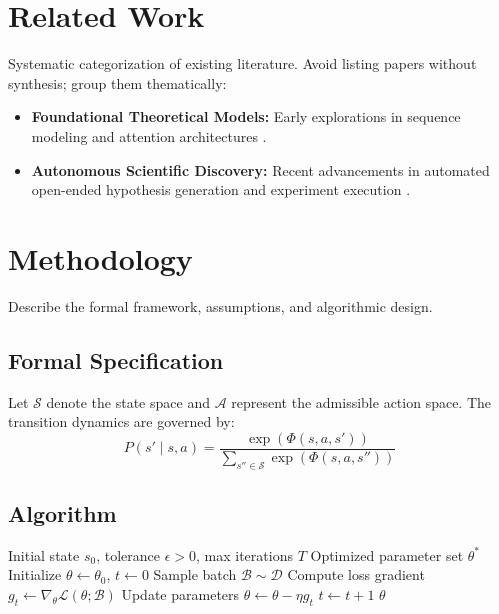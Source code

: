 \documentclass[11pt,a4paper]{article}
\begin{document}
\section{Related Work}
\label{sec:related}
Systematic categorization of existing literature. Avoid listing papers without synthesis; group them thematically:
\begin{itemize}
    \item \textbf{Foundational Theoretical Models:} Early explorations in sequence modeling and attention architectures \citep{vaswani2017attention}.
    \item \textbf{Autonomous Scientific Discovery:} Recent advancements in automated open-ended hypothesis generation and experiment execution \citep{lu2024aiscientist}.
\end{itemize}

\section{Methodology}
\label{sec:method}
Describe the formal framework, assumptions, and algorithmic design.

\subsection{Formal Specification}
Let $\mathcal{S}$ denote the state space and $\mathcal{A}$ represent the admissible action space. The transition dynamics are governed by:
\begin{equation}
    P(s' \mid s, a) = \frac{\exp\left( \Phi(s, a, s') \right)}{\sum_{s'' \in \mathcal{S}} \exp\left( \Phi(s, a, s'') \right)}
    \label{eq:transition}
\end{equation}

\subsection{Algorithm}
\begin{algorithm}[H]
\caption{Iterative Verification Pipeline}
\label{alg:verification}
\begin{algorithmic}[1]
\Require Initial state $s_0$, tolerance $\epsilon > 0$, max iterations $T$
\Ensure Optimized parameter set $\theta^*$
\State Initialize $\theta \gets \theta_0$, $t \gets 0$
    \State Sample batch $\mathcal{B} \sim \mathcal{D}$
    \State Compute loss gradient $g_t \gets \nabla_\theta \mathcal{L}(\theta; \mathcal{B})$
    \State Update parameters $\theta \gets \theta - \eta g_t$
    \State $t \gets t + 1$
\EndWhile
\State \Return $\theta$
\end{algorithmic}
\end{algorithm}
\end{document}
